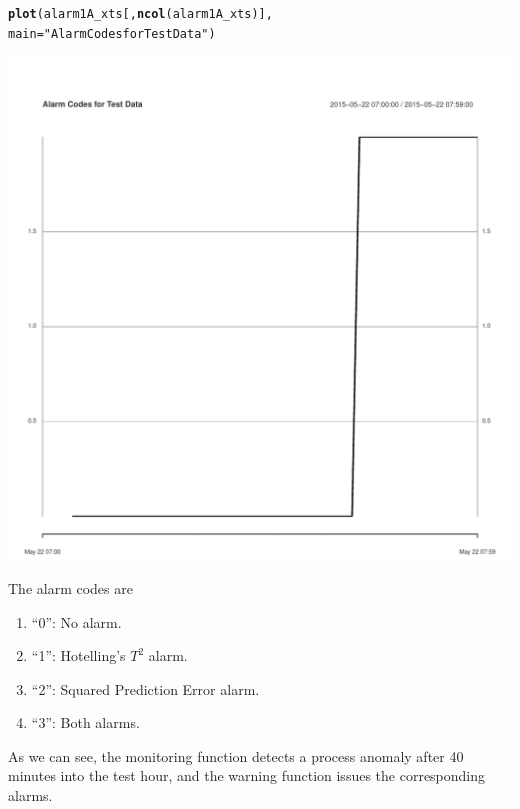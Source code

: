 \documentclass{report}\usepackage[]{graphicx}\usepackage[]{color}
\makeatletter
\def\maxwidth{ %
  \ifdim\Gin@nat@width>\linewidth
    \linewidth
  \else
    \Gin@nat@width
  \fi
}
\newcommand{\hlstr}[1]{\textcolor[rgb]{0.192,0.494,0.8}{#1}}%
\newcommand{\hlstd}[1]{\textcolor[rgb]{0.345,0.345,0.345}{#1}}%
\newcommand{\hlkwc}[1]{\textcolor[rgb]{0.333,0.667,0.333}{#1}}%
\newcommand{\hlkwd}[1]{\textcolor[rgb]{0.737,0.353,0.396}{\textbf{#1}}}%
\newenvironment{kframe}{%
 \def\at@end@of@kframe{}%
 \ifinner\ifhmode%
  \def\at@end@of@kframe{\end{minipage}}%
  \begin{minipage}{\columnwidth}%
 \fi\fi%
 \def\FrameCommand##1{\hskip\@totalleftmargin \hskip-\fboxsep
 \colorbox{shadecolor}{##1}\hskip-\fboxsep
     \hskip-\linewidth \hskip-\@totalleftmargin \hskip\columnwidth}%
 \MakeFramed {\advance\hsize-\width
   \@totalleftmargin\z@ \linewidth\hsize
   \@setminipage}}%
 {\par\unskip\endMakeFramed%
 \at@end@of@kframe}
\newenvironment{knitrout}{}{} %
\makeatother
\begin{document}
\begin{knitrout}
\color{fgcolor}\begin{kframe}
\begin{alltt}
\hlkwd{plot}\hlstd{(alarm1A_xts[,} \hlkwd{ncol}\hlstd{(alarm1A_xts)],}
     \hlkwc{main} \hlstd{=} \hlstr{"Alarm Codes for Test Data"}\hlstd{)}
\end{alltt}
\end{kframe}
\includegraphics[width=\maxwidth]{figure/r_warning_Plot-1}

\end{knitrout}
\noindent The alarm codes are
\begin{enumerate}
\item ``0'': No alarm.
\item ``1'': Hotelling's $T^2$ alarm.
\item ``2'': Squared Prediction Error alarm.
\item ``3'': Both alarms.
\end{enumerate}
\noindent As we can see, the monitoring function detects a process anomaly after 40 minutes into the test hour, and the warning function issues the corresponding alarms.



\end{document}
